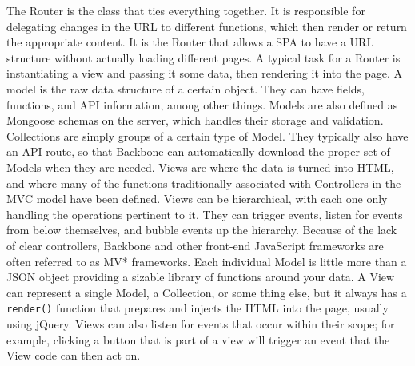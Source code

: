 \documentclass[12pt]{article}
\newcommand{\comment}[1]{{\bf \tt  {#1}}}
\newcommand{\emcomment}[1]{\textcolor{ForestGreen}{\comment{Elena: {#1}}}}
\newcommand{\code}[1]{{\texttt {#1}}}
\begin{document}
The Router is the class that ties everything together. It is responsible for delegating changes in the URL to different functions, which then render or return the appropriate content. It is the Router that allows a SPA to have a URL structure without actually loading different pages. A typical task for a Router is instantiating a view and passing it some data, then rendering it into the page. A model is the raw data structure of a certain object. They can have fields, functions, and API information, among other things.  Models are also defined as Mongoose schemas on the server, which handles their storage and validation. Collections are simply groups of a certain type of Model. They typically also have an API route, so that Backbone can automatically download the proper set of Models when they are needed. Views are where the data is turned into HTML, and where many of the functions traditionally associated with Controllers in the MVC model have been defined. Views can be hierarchical, with each one only handling the operations pertinent to it. They can trigger events, listen for events from below themselves, and bubble events up the hierarchy. Because of the lack of clear controllers, Backbone and other front-end JavaScript frameworks are often referred to as MV* frameworks. Each individual Model is little more than a JSON object providing a sizable library of functions around your data. A View can represent a single Model, a Collection, or some thing else, but it always has a \code{render()} function that prepares and injects the HTML into the page, usually using jQuery. Views can also listen for events that occur within their scope; for example, clicking a button that is part of a view will trigger an event that the View code can then act on. 



\end{document}

